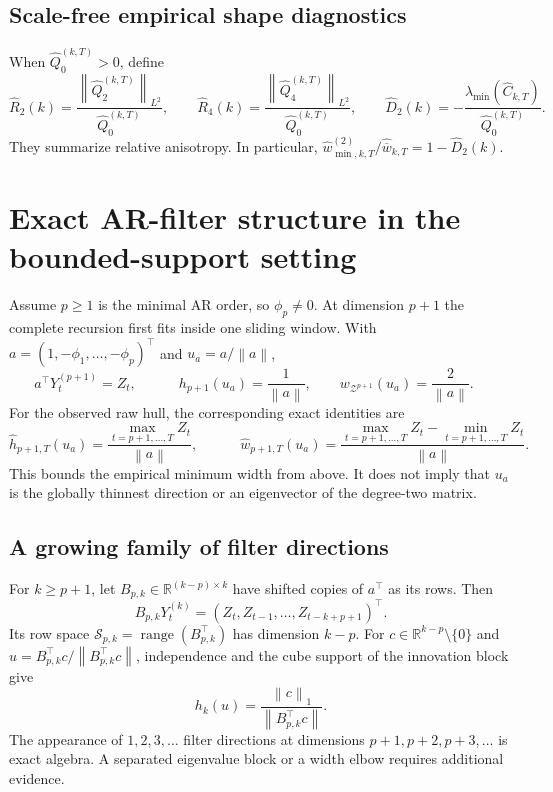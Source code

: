 \documentclass[11pt,a4paper]{article}
\newcommand{\R}{\mathbb R}
\newcommand{\norm}[1]{\left\lVert #1\right\rVert}
\newcommand{\hh}{\widehat h}
\newcommand{\hQ}{\widehat Q}
\newcommand{\hC}{\widehat C}
\begin{document}
\subsection*{Scale-free empirical shape diagnostics}
When $\hQ_0^{(k,T)}>0$, define
\[
 \widehat R_2(k)=\frac{\norm{\hQ_2^{(k,T)}}_{L^2}}{\hQ_0^{(k,T)}},\qquad
 \widehat R_4(k)=\frac{\norm{\hQ_4^{(k,T)}}_{L^2}}{\hQ_0^{(k,T)}},\qquad
 \widehat D_2(k)=-\frac{\lambda_{\min}(\hC_{k,T})}{\hQ_0^{(k,T)}}.
\]
They summarize relative anisotropy. In particular,
$\widehat w_{\min,k,T}^{(2)}/\widehat{\overline w}_{k,T}=1-\widehat D_2(k)$.

\newpage
\section{Exact AR-filter structure in the bounded-support setting}\label{sec:ar}
Assume $p\ge1$ is the minimal AR order, so $\phi_p\ne0$. At dimension $p+1$ the
complete recursion first fits inside one sliding window. With
$a=(1,-\phi_1,\ldots,-\phi_p)^\top$ and $u_a=a/\norm a$,
\[
 a^\top Y_t^{(p+1)}=Z_t,\qquad
 \boxed{\quad h_{p+1}(u_a)=\frac1{\norm a},\qquad
 w_{\mathcal Z^{p+1}}(u_a)=\frac2{\norm a}.\quad}
\]
For the observed raw hull, the corresponding exact identities are
\[
 \hh_{p+1,T}(u_a)=\frac{\max_{t=p+1,\ldots,T}Z_t}{\norm a},\qquad
 \boxed{\quad
 \widehat w_{p+1,T}(u_a)=
 \frac{\max_{t=p+1,\ldots,T}Z_t-\min_{t=p+1,\ldots,T}Z_t}{\norm a}.
 \quad}
\]
This bounds the empirical minimum width from above. It does not imply that $u_a$
is the globally thinnest direction or an eigenvector of the degree-two matrix.

\subsection*{A growing family of filter directions}
For $k\ge p+1$, let $B_{p,k}\in\R^{(k-p)\times k}$ have shifted copies of $a^\top$
as its rows. Then
\[
 B_{p,k}Y_t^{(k)}=(Z_t,Z_{t-1},\ldots,Z_{t-k+p+1})^\top.
\]
Its row space $\mathcal S_{p,k}=\operatorname{range}(B_{p,k}^\top)$ has dimension
$k-p$. For $c\in\R^{k-p}\setminus\{0\}$ and
$u=B_{p,k}^\top c/\norm{B_{p,k}^\top c}$, independence and the cube support of
the innovation block give
\[
 h_k(u)=\frac{\norm{c}_1}{\norm{B_{p,k}^\top c}}.
\]
The appearance of $1,2,3,\ldots$ filter directions at dimensions
$p+1,p+2,p+3,\ldots$ is exact algebra. A separated eigenvalue block or a width
elbow requires additional evidence.
\end{document}
